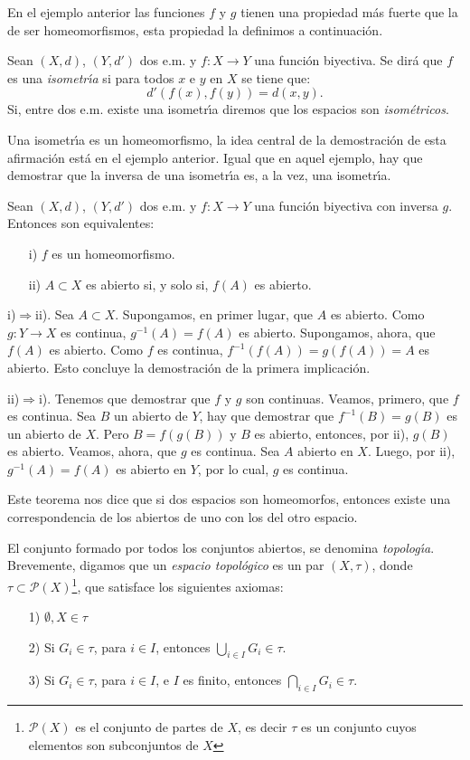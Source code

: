 En el ejemplo anterior las funciones $f$ y $g$ tienen una
propiedad más fuerte que la de ser homeomorfismos, esta
propiedad la definimos a continuación.
\begin{definicion}{} Sean $(X,d)$, $(Y,d')$ dos e.m. y
$f:X\rightarrow Y$ una función biyectiva. Se dirá que $f$ es
una \emph{isometr\'{\i}a} si para todos $x$ e $y$ en $X$ se tiene
que:
\[
    d'(f(x),f(y))=d(x,y).
\]
Si, entre dos e.m. existe una isometr\'{\i}a diremos que los
espacios son \emph{isométricos}.
\end{definicion}

Una isometr\'{\i}a es un homeomorfismo, la idea central de la
demostración de esta afirmación está en el ejemplo anterior.
Igual que en aquel ejemplo, hay que demostrar que la inversa de
una isometr\'{\i}a es, a la vez, una isometr\'{\i}a.

\begin{proposicion}{} Sean $(X,d)$, $(Y,d')$ dos e.m. y
$f:X\rightarrow Y$ una función biyectiva con inversa $g$.
Entonces son equivalentes:
\begin{itemize}
\item[i)] $f$ es un homeomorfismo.
\item[ii)] $A\subset X$ es abierto si, y solo si, $f(A)$ es
abierto.
\end{itemize}
\end{proposicion}
\begin{demo} i)$\Rightarrow$ii). Sea $A\subset X$. Supongamos, en primer lugar,
que $A$ es abierto. Como $g:Y\rightarrow X$ es continua,
$g^{-1}(A)=f(A)$ es abierto. Supongamos, ahora, que $f(A)$ es
abierto. Como $f$ es continua, $f^{-1}(f(A))=g(f(A))=A$ es
abierto. Esto concluye la demostración de la primera
implicación.

ii)$\Rightarrow$i). Tenemos que demostrar que $f$ y $g$ son
continuas. Veamos, primero, que $f$ es continua. Sea $B$ un
abierto de $Y$, hay que demostrar que $f^{-1}(B)=g(B)$ es un
abierto de $X$. Pero $B=f(g(B))$ y $B$ es abierto, entonces, por
ii), $g(B)$ es abierto. Veamos, ahora, que $g$ es continua. Sea
$A$ abierto en $X$. Luego, por ii), $g^{-1}(A)=f(A)$ es abierto en
$Y$, por lo cual, $g$ es continua.
\end{demo}

Este teorema nos dice que si dos espacios son homeomorfos,
entonces existe una correspondencia de los abiertos de uno con los
del otro espacio.

El conjunto formado por todos los conjuntos abiertos, se denomina
\emph{topolog\'{\i}a}. Brevemente, digamos que un \emph{espacio
topológico} es un par $(X,\tau)$, donde $\tau\subset
\mathcal{P}(X)$\footnote{$\mathcal{P}(X)$ es el conjunto de partes
de $X$, es decir $\tau$ es un conjunto cuyos elementos son
subconjuntos de $X$}, que satisface los siguientes axiomas:
\begin{itemize}
    \item[1)] $\emptyset, X\in \tau$
    \item[2)] Si $G_i\in\tau$, para $i\in I$, entonces
    $\bigcup_{i\in I}G_i\in \tau$.
    \item[3)] Si $G_i\in\tau$, para $i\in I$, e $I$ es finito, entonces
    $\bigcap_{i\in I}G_i\in \tau$.
\end{itemize}

